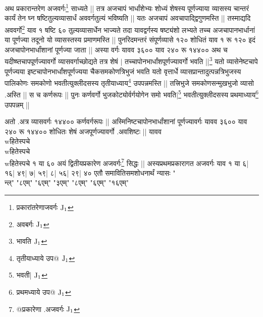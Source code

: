\documentclass[12pt]{article}
\begin{document}
{अथ
प्रकारान्तरेण अजवर्गः\footnote{{\s प्रकारांतरेणाजवर्गः }${\rm J_1}$}
साध्यते ||
तत्र अजचापं भार्धांशेभ्यः शोध्यं शेषस्य
पूर्णज्याया व्यासस्य चान्तरं कार्यं तेन घ्न षष्टितुल्यव्यासार्धं
अववर्गतुल्यं भविष्यति ||
यतः अजचापं अवचापाद्द्विगुणमस्ति ||
तस्माद्यदि अववर्गो\footnote{{\s अवबर्गः} ${\rm J_1}$}
याव १ षष्टि ६० तुल्यव्यासार्धेन भाज्यते तदा यावद्वर्गस्य
षष्ट्यंशो लभ्यते तच्च अजचापानभार्धानां या पूर्णज्या
तदूनो यो व्यासस्तस्य प्रमाणमस्ति ||
पुनरिदमन्तरं संपूर्णव्यासे १२० शोधितं
याव १  रू १२०
इदं अजचापोनभार्धांशानां पूर्णज्या जाता ||
अस्या वर्गः %
यावव ३६०० याव २४०
रू १४४००
अथ च यदीष्ष्तचापपूर्णज्यावर्गो व्यासवर्गाच्छोद्यते
तत्र शेषं
$|$
तच्चापोनभार्धांशपूर्णज्यावर्गो
भवति ||\footnote{{\s भावति }${\rm J_1}$}
यतो व्यासेनेष्टचापे पूर्णज्यया इष्टचापोनभार्धांशपूर्णज्यया
चैकसमकोणत्रि\-भुजं भवति यतो वृत्तार्धे व्यासप्रान्तादुत्पन्नत्रिभुजस्य
पालिकोणः समकोणो
भवतीत्युक्लीदसस्य
तृतीयाध्याय\footnote{{\s तृतीयाध्याये उप@ }${\rm J_1}$}
उपपन्न\-मस्ति ||
तत्त्रिभुजे
समकोणसन्मुखभुजो व्यासो .अस्ति ||
स च कर्णरूपः ||
पुनः कर्णवर्गो भुजकोट्योर्वर्गयोगेन समो
भवति|\footnote{{\s भवती| }${\rm J_1}$}
भवतीत्युक्लीदसस्य
प्रथमाध्याय\footnote{{\s प्रथमध्याये उप@ }${\rm J_1}$}
उपपन्नम् ||

अतो .अत्र व्यासवर्गः १४४०० कर्णवर्गरूपः ||
अस्मिनिष्टचापोनभार्धांशानां पूर्णज्यावर्गः
यावव ३६०० याव २४०
रू १४४०० %
शोधितः शेषं अजपूर्णज्यावर्गो .अवशिष्टः ||
यावव \\wहितेस्पचे\\wहितेस्पचे\\wहितेस्पचे
१  या ६०
अयं
द्वितीयप्रकारेण अजवर्गः\footnote{{\s @प्रकारेणा .अजवर्गः }${\rm J_1}$}
सिद्धः ||
अस्यप्रथमप्रकारागत अजवर्गः याव १ या ६| १६| ४९| ७| ५९| ८| ५६| २९| ४०
एतौ समावितिसमशोधनार्थं न्यासः
"\\न्ल्"
"{८एम्}"
"{६एम्}"
"{३एम्}"
"{८एम्}"
"{६एम्}"
"{१६एम्}"

}
\end{document}
